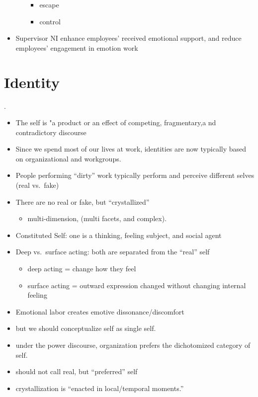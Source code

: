 \documentclass[
]{book}
\providecommand{\tightlist}{%
  \setlength{\itemsep}{0pt}\setlength{\parskip}{0pt}}
\begin{document}
\begin{itemize}
\begin{itemize}
    \begin{itemize}
    \item
      escape
    \item
      control
    \end{itemize}
  \end{itemize}
\item
  Supervisor NI enhance employees' received emotional support, and reduce employees' engagement in emotion work
\end{itemize}

\hypertarget{identity}{%
\chapter{Identity}\label{identity}}

\citep{Tracy_2005}.

\begin{itemize}
\item
  The self is "a product or an effect of competing, fragmentary,a nd contradictory discourse \citep{Tracy_2005}
\item
  Since we spend most of our lives at work, identities are now typically based on organizational and workgroups.
\item
  People performing ``dirty'' work typically perform and perceive different selves (real vs.~fake)
\item
  There are no real or fake, but ``crystallized''

  \begin{itemize}
  \tightlist
  \item
    multi-dimension, (multi facets, and complex).
  \end{itemize}
\item
  Constituted Self: one is a thinking, feeling subject, and social agent
\item
  Deep vs.~surface acting: both are separated from the ``real'' self

  \begin{itemize}
  \item
    deep acting = change how they feel
  \item
    surface acting = outward expression changed without changing internal feeling
  \end{itemize}
\item
  Emotional labor creates emotive dissonance/discomfort
\item
  but we should conceptualize self as single self.
\item
  under the power discourse, organization prefers the dichotomized category of self.
\item
  should not call real, but ``preferred'' self
\item
  crystallization is ``enacted in local/temporal moments.''
\end{itemize}
\end{document}
